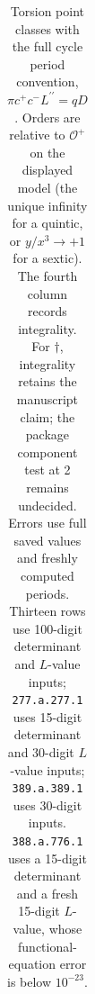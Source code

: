 \begin{table}[htbp]
\begin{tabular}{@{}lcccrr@{}}
\bottomrule\end{tabular}
\caption{Torsion point classes with the full cycle period convention, $\pi c^+c^-L^{\prime\prime}=qD$. Orders are relative to $\mathcal O^+$ on the displayed model (the unique infinity for a quintic, or $y/x^3\to+1$ for a sextic). The fourth column records integrality. For $\dagger$, integrality retains the manuscript claim; the package component test at 2 remains undecided. Errors use full saved values and freshly computed periods. Thirteen rows use 100-digit determinant and $L$-value inputs; \texttt{277.a.277.1} uses 15-digit determinant and 30-digit $L$-value inputs; \texttt{389.a.389.1} uses 30-digit inputs. \texttt{388.a.776.1} uses a 15-digit determinant and a fresh 15-digit $L$-value, whose functional-equation error is below $10^{-23}$.}
\label{tab:torsion-integrality}
\end{table}

